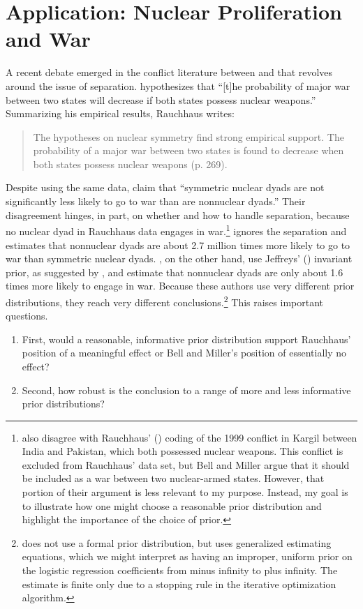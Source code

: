 \documentclass[12pt]{article}
\begin{document}
\section*{Application: Nuclear Proliferation and War}

A recent debate emerged in the conflict literature between \cite{Rauchhaus2009} and \cite{BellMiller2015} that revolves around the issue of separation. 
\citet[p. 262]{Rauchhaus2009} hypothesizes that ``[t]he probability of major war between two states will decrease if both states possess nuclear weapons.'' 
Summarizing his empirical results, Rauchhaus writes:
\begin{quote} 
The hypotheses on nuclear symmetry find strong empirical support. The probability of a major war between two states is found to decrease when both states possess nuclear weapons (p. 269).
\end{quote}

Despite using the same data, \citet[p. 9]{BellMiller2015} claim that ``symmetric nuclear dyads are not significantly less likely to go to war than are nonnuclear dyads.'' 
Their disagreement hinges, in part, on whether and how to handle separation, because no nuclear dyad in Rauchhaus data engages in war.\footnote{
\cite{BellMiller2015} also disagree with Rauchhaus' (\citeyear{Rauchhaus2009}) coding of the 1999 conflict in Kargil between India and Pakistan, which both possessed nuclear weapons. 
This conflict is excluded from Rauchhaus' data set, but Bell and Miller argue that it should be included as a war between two nuclear-armed states. 
However, that portion of their argument is less relevant to my purpose. 
Instead, my goal is to illustrate how one might choose a reasonable prior distribution and highlight the importance of the choice of prior.} 
\cite{Rauchhaus2009} ignores the separation and estimates that nonnuclear dyads are about 2.7 million times more likely to go to war than symmetric nuclear dyads.
\cite{BellMiller2015}, on the other hand, use Jeffreys' (\citeyear{Jeffreys1946}) invariant prior, as suggested by \cite{Zorn2005}, and estimate that nonnuclear dyads are only about 1.6 times more likely to engage in war. 
Because these authors use very different prior distributions, they reach very different conclusions.\footnote{
\cite{Rauchhaus2009} does not use a formal prior distribution, but uses generalized estimating equations, which we might interpret as having an improper, uniform prior on the logistic regression coefficients from minus infinity to plus infinity. 
The estimate is finite only due to a stopping rule in the iterative optimization algorithm.} 
This raises important questions. 
\begin{enumerate}
\item First, would a reasonable, informative prior distribution support Rauchhaus' position of a meaningful effect or Bell and Miller's position of essentially no effect? 
\item Second, how robust is the conclusion to a range of more and less informative prior distributions?
\end{enumerate}
\end{document}
